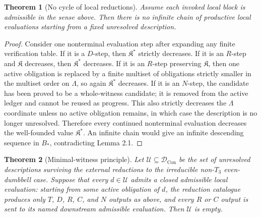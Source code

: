 \documentclass[11pt]{amsart}
\newtheorem{theorem}{Theorem}[section]
\theoremstyle{definition}
\begin{document}
\begin{theorem}[No cycle of local reductions]
Assume each invoked local block
is admissible in the sense above. Then there is no infinite chain of productive
local evaluations starting from a fixed unresolved description.

\end{theorem}
\begin{proof}
Consider one nonterminal evaluation step after expanding any finite
verification table. If it is a \(D\)-step, then \(\mathfrak K^\ast\) strictly
decreases. If it is an \(R\)-step and \(\mathfrak K\) decreases, then
\(\mathfrak K^\ast\) decreases. If it is an \(R\)-step preserving \(\mathfrak K\), then
one active obligation is replaced by a finite multiset of obligations strictly
smaller in the multiset order on \(\Lambda\), so again \(\mathfrak K^\ast\)
decreases. If it is an \(N\)-step, the candidate has been proved to be a
whole-witness candidate; it is removed from the active ledger and cannot be
reused as progress. This also strictly decreases the \(\Lambda\) coordinate unless
no active obligation remains, in which case the description is no longer
unresolved. Therefore every continued nonterminal evaluation decreases the
well-founded value \(\mathfrak K^\ast\). An infinite chain would give an infinite
descending sequence in \(B_\ast\), contradicting Lemma 2.1.

\end{proof}
\begin{theorem}[Minimal-witness principle]
Let \(\mathcal U\subseteq\mathcal D_{\mathrm{Con}}\) be the set of unresolved descriptions surviving the external reductions to the irreducible non-\(T_3\) even-dumbbell case. Suppose that every \(d\in\mathcal U\) admits a closed admissible local evaluation: starting from some active obligation of \(d\), the reduction catalogue produces only \(T\), \(D\), \(R\), \(C\), and \(N\) outputs as above, and every \(R\) or \(C\) output is sent to its named downstream admissible evaluation. Then \(\mathcal U\) is empty.

\end{theorem}
\end{document}
